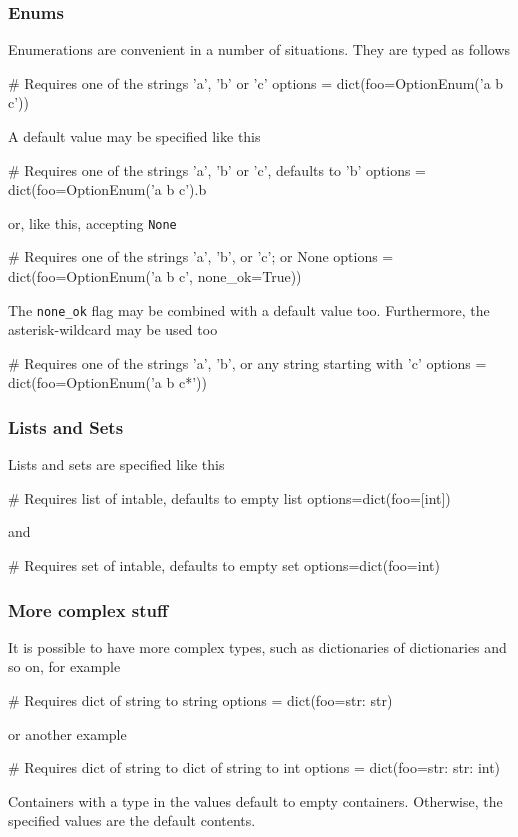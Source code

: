 \subsubsection*{Enums}
Enumerations are convenient in a number of situations.  They are typed
as follows
\begin{python}
  # Requires one of the strings 'a', 'b' or 'c'
  options = dict(foo=OptionEnum('a b c'))
\end{python}
A default value may be specified like this
\begin{python}
   # Requires one of the strings 'a', 'b' or 'c', defaults to 'b'
  options = dict(foo=OptionEnum('a b c').b
\end{python}
or, like this, accepting \texttt{None}
\begin{python}
  # Requires one of the strings 'a', 'b', or 'c'; or None
  options = dict(foo=OptionEnum('a b c', none_ok=True))
\end{python}
The \texttt{none\_ok} flag may be combined with a default value too.
Furthermore, the asterisk-wildcard may be used too
\begin{python}
  # Requires one of the strings 'a', 'b', or any string starting with 'c'
  options = dict(foo=OptionEnum('a b c*'))
\end{python}



\subsubsection*{Lists and Sets}
Lists and sets are specified like this
\begin{python}
  # Requires list of intable, defaults to empty list
  options=dict(foo=[int])
\end{python}
and
\begin{python}
  # Requires set of intable, defaults to empty set
  options=dict(foo={int})
\end{python}



\subsubsection*{More complex stuff}
It is possible to have more complex types, such as dictionaries of
dictionaries and so on, for example
\begin{python}
  # Requires dict of string to string
  options = dict(foo={str: str})
\end{python}
or another example
\begin{python}
  # Requires dict of string to dict of string to int
  options = dict(foo={str: {str: int}})
\end{python}
Containers with a type in the values default to empty containers.
Otherwise, the specified values are the default contents.



